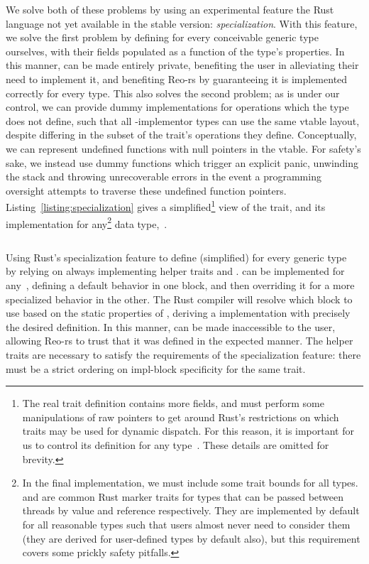 We solve both of these problems by using an experimental feature the Rust language not yet available in the stable version: \textit{specialization}. With this feature, we solve the first problem by defining  for every conceivable generic type ourselves, with their fields populated as a function of the type's properties. In this manner,  can be made entirely private, benefiting the user in alleviating their need to implement it, and benefiting Reo-rs by guaranteeing it is implemented correctly for every type. This also solves the second problem; as  is under our control, we can provide dummy implementations for operations which the type does not define, such that all -implementor types can use the same vtable layout, despite differing in the subset of the trait's operations they define. Conceptually, we can represent undefined functions with null pointers in the vtable. For safety's sake, we instead use dummy functions which trigger an explicit panic, unwinding the stack and throwing unrecoverable errors in the event a programming oversight attempts to traverse these undefined function pointers. Listing~\ref{listing:specialization} gives a simplified\footnote{The real trait definition contains more fields, and must perform some manipulations of raw pointers to get around Rust's restrictions on which traits may be used for dynamic dispatch. For this reason, it is important for us to control its definition for any type~. These details are omitted for brevity.} view of the  trait, and its implementation for any\footnote{In the final implementation, we must include some trait bounds for all  types.  and  are common Rust marker traits for types that can be passed between threads by value and reference respectively. They are implemented by default for all reasonable types such that users almost never need to consider them~\cite{klabnik2018rust} (they are derived for user-defined types by default also), but this requirement covers some prickly safety pitfalls.} data type,~.

\begin{listing}[ht]
	\centering
	\inputminted{rust}{specialization.rs}
	\caption[Rust specialization to implement traits.]{Using Rust's specialization feature to define  (simplified) for every generic type~ by relying on  always implementing helper traits  and .  can be implemented for any~, defining a default behavior in one block, and then overriding it for a more specialized behavior in the other. The Rust compiler will resolve which block to use based on the static properties of , deriving a  implementation with precisely the desired definition. In this manner,  can be made inaccessible to the user, allowing Reo-rs to trust that it was defined in the expected manner. The helper traits are necessary to satisfy the requirements of the specialization feature: there must be a strict ordering on impl-block specificity for the same trait.}
	\label{listing:specialization}
\end{listing}

